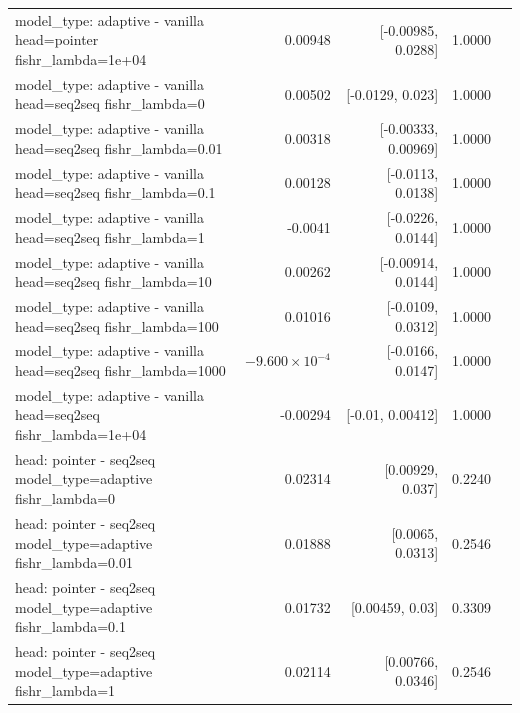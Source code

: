 \documentclass[10pt]{article}
\makeatletter
\newcommand{\stackcell}[1]{\begin{tabular}[t]{@{}l@{}}#1\end{tabular}}
\makeatother
\begin{document}
{\begin{longtable}{lrrrl}
\stackcell{model\_type: adaptive - vanilla\\\footnotesize head=pointer fishr\_lambda=1e+04 } & 0.00948 & [-0.00985, 0.0288] & 1.0000 & \\
\stackcell{model\_type: adaptive - vanilla\\\footnotesize head=seq2seq fishr\_lambda=0 } & 0.00502 & [-0.0129, 0.023] & 1.0000 & \\
\stackcell{model\_type: adaptive - vanilla\\\footnotesize head=seq2seq fishr\_lambda=0.01 } & 0.00318 & [-0.00333, 0.00969] & 1.0000 & \\
\stackcell{model\_type: adaptive - vanilla\\\footnotesize head=seq2seq fishr\_lambda=0.1 } & 0.00128 & [-0.0113, 0.0138] & 1.0000 & \\
\stackcell{model\_type: adaptive - vanilla\\\footnotesize head=seq2seq fishr\_lambda=1 } & -0.0041 & [-0.0226, 0.0144] & 1.0000 & \\
\stackcell{model\_type: adaptive - vanilla\\\footnotesize head=seq2seq fishr\_lambda=10 } & 0.00262 & [-0.00914, 0.0144] & 1.0000 & \\
\stackcell{model\_type: adaptive - vanilla\\\footnotesize head=seq2seq fishr\_lambda=100 } & 0.01016 & [-0.0109, 0.0312] & 1.0000 & \\
\stackcell{model\_type: adaptive - vanilla\\\footnotesize head=seq2seq fishr\_lambda=1000 } & $-9.600\times10^{-4}$ & [-0.0166, 0.0147] & 1.0000 & \\
\stackcell{model\_type: adaptive - vanilla\\\footnotesize head=seq2seq fishr\_lambda=1e+04 } & -0.00294 & [-0.01, 0.00412] & 1.0000 & \\
\stackcell{head: pointer - seq2seq\\\footnotesize model\_type=adaptive fishr\_lambda=0 } & 0.02314 & [0.00929, 0.037] & 0.2240 & \\
\stackcell{head: pointer - seq2seq\\\footnotesize model\_type=adaptive fishr\_lambda=0.01 } & 0.01888 & [0.0065, 0.0313] & 0.2546 & \\
\stackcell{head: pointer - seq2seq\\\footnotesize model\_type=adaptive fishr\_lambda=0.1 } & 0.01732 & [0.00459, 0.03] & 0.3309 & \\
\stackcell{head: pointer - seq2seq\\\footnotesize model\_type=adaptive fishr\_lambda=1 } & 0.02114 & [0.00766, 0.0346] & 0.2546 & \\

\end{longtable}}
\end{document}

